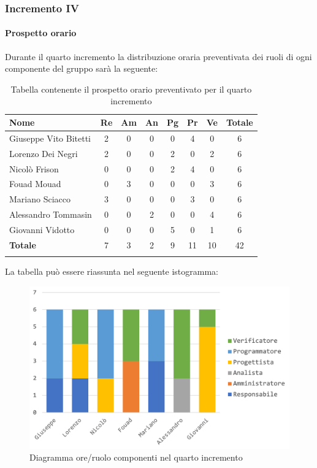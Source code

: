 			
		\subsubsection{Incremento IV}
			\paragraph{Prospetto orario}
			Durante il quarto incremento la distribuzione oraria preventivata dei ruoli di ogni componente del gruppo sarà la seguente:
			
			\begin{longtable}{|l|c|c|c|c|c|c|c|}
				\hline
				\rowcolor{lighter-grayer}
				\textbf{Nome} & \textbf{Re} & \textbf{Am} & \textbf{An} & \textbf{Pg}  & \textbf{Pr}   & \textbf{Ve} & \textbf{Totale} \\
				\hline
				\endfirsthead
				
				\hline
				Giuseppe Vito Bitetti 		 & 2 & 0 & 0 & 0 & 4 & 0 & 6\\
				\hline
				\hline
				Lorenzo Dei Negri			 & 2 & 0 & 0 & 2 & 0 & 2 & 6\\
				\hline
				\hline
				Nicolò Frison				    & 0 & 0 & 0 & 2 & 4 & 0 & 6\\
				\hline
				\hline
				Fouad Mouad 				 & 0 & 3 & 0 & 0 & 0 & 3 & 6\\
				\hline
				\hline
				Mariano Sciacco 			 & 3 & 0 & 0 & 0 & 3 & 0 & 6\\
				\hline
				\hline
				Alessandro Tommasin     & 0 & 0 & 2 & 0 & 0 & 4 & 6\\
				\hline
				\hline
				Giovanni Vidotto 			 & 0 & 0 & 0 & 5 & 0 & 1 & 6\\
				\hline 
				\textbf{Totale}			 		& 7 & 3 & 2 & 9 & 11 & 10 & 42\\
				\hline
				\caption{Tabella contenente il prospetto orario preventivato per il quarto incremento}
			\end{longtable}
			\pagebreak
			
			La tabella può essere riassunta nel seguente istogramma:
			\begin{figure}[H]
				\centering
				\includegraphics[width=0.8\linewidth]{./images/preventivo/incremento4-1.png}
				\caption{Diagramma ore/ruolo componenti nel quarto  incremento}
				\label{fig:diagramma suddivione ruoli incremento IV}
			\end{figure}
			
